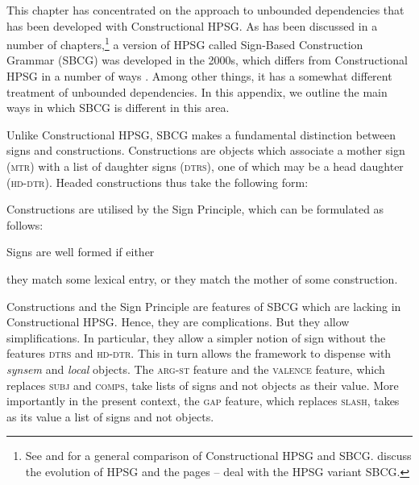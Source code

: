 \documentclass[output=paper,biblatex,babelshorthands,newtxmath,draftmode,colorlinks,citecolor=brown]{langscibook}
\begin{document}
This chapter has concentrated on the approach to unbounded
dependencies that has been developed with Constructional HPSG. As
has been discussed in a number of chapters,\footnote{
{See  and  for a general comparison of
  Constructional HPSG and SBCG. \citet{chapters/evolution} discuss the
  evolution of HPSG and the pages \pageref{page-sbcg-start}--\pageref{page-sbcg-end} deal with the
  HPSG variant SBCG.}
} a version of HPSG called
Sign-Based Construction Grammar (SBCG) was developed in the 2000s,
which differs from Constructional HPSG in a number of ways
\citep{Sag:12}. Among other things, it has a somewhat different
treatment of unbounded dependencies. In this appendix, we outline the
main ways in which SBCG is different in this area.

\begin{sloppypar}
Unlike Constructional HPSG, SBCG makes a fundamental distinction
between signs and constructions. Constructions are objects which
associate a mother sign (\textsc{mtr}) with a list of daughter signs
(\textsc{dtrs}), one of which may be a head daughter
(\textsc{hd-dtr}). Headed constructions thus take the following form:
\end{sloppypar}

\begin{exe}
  \ex \label{ex:UDC:SBCG:cx}

\end{exe}
\noindent
Constructions are utilised by the Sign Principle, which can be
formulated as follows:

\begin{exe}
  \ex \label{ex:UDC:SBCG:SignPrinciple} Signs are well formed if either

  \begin{xlist}
    \ex they match some lexical entry, or \ex they match the mother of
    some construction.
  \end{xlist}
\end{exe}

\noindent
Constructions and the Sign Principle are features of SBCG which
are lacking in Constructional HPSG. Hence, they are
complications. But they allow simplifications. In particular, they
allow a simpler notion of sign without the features \textsc{dtrs} and
\textsc{hd-dtr}. This in turn allows the framework to dispense with
\textit{synsem} and \textit{local} objects. The \textsc{arg-st}
feature and the \textsc{valence} feature, which replaces \textsc{subj}
and \textsc{comps}, take lists of signs and not  objects as
their value. More importantly in the present context, the \textsc{gap}
feature, which replaces \textsc{slash}, takes as its value a list of
signs and not  objects.
\end{document}
